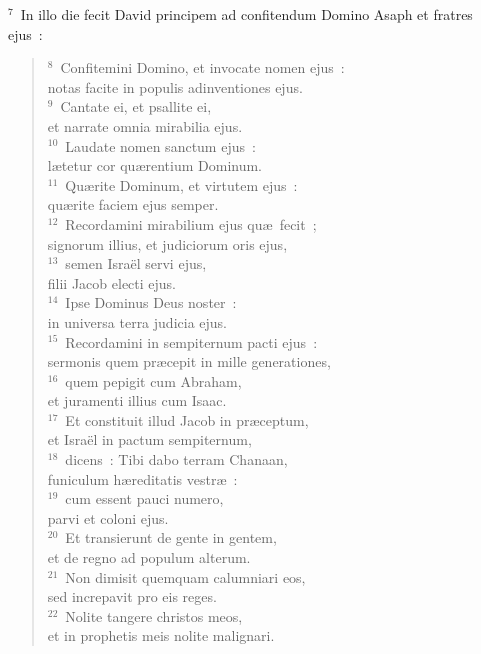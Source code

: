 ${}^{7}$~In illo die fecit David principem ad confitendum Domino Asaph et fratres ejus~:
\begin{flushleft}\begin{verse}${}^{8}$~Confitemini Domino, et invocate nomen ejus~:\\ notas facite in populis adinventiones ejus.\\
${}^{9}$~Cantate ei, et psallite ei,\\ et narrate omnia mirabilia ejus.\\
${}^{10}$~Laudate nomen sanctum ejus~:\\ l\ae tetur cor qu\ae rentium Dominum.\\
${}^{11}$~Qu\ae rite Dominum, et virtutem ejus~:\\ qu\ae rite faciem ejus semper.\\
${}^{12}$~Recordamini mirabilium ejus qu\ae\ fecit~;\\ signorum illius, et judiciorum oris ejus,\\
${}^{13}$~semen Isra\"el servi ejus,\\ filii Jacob electi ejus.\\
${}^{14}$~Ipse Dominus Deus noster~:\\ in universa terra judicia ejus.\\
${}^{15}$~Recordamini in sempiternum pacti ejus~:\\ sermonis quem pr\ae cepit in mille generationes,\\
${}^{16}$~quem pepigit cum Abraham,\\ et juramenti illius cum Isaac.\\
${}^{17}$~Et constituit illud Jacob in pr\ae ceptum,\\ et Isra\"el in pactum sempiternum,\\
${}^{18}$~dicens~: Tibi dabo terram Chanaan,\\ funiculum h\ae reditatis vestr\ae~:\\
${}^{19}$~cum essent pauci numero,\\ parvi et coloni ejus.\\
${}^{20}$~Et transierunt de gente in gentem,\\ et de regno ad populum alterum.\\
${}^{21}$~Non dimisit quemquam calumniari eos,\\ sed increpavit pro eis reges.\\
${}^{22}$~Nolite tangere christos meos,\\ et in prophetis meis nolite malignari.\\

\end{verse}
\end{flushleft}
